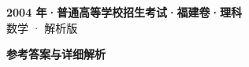 \documentclass[zihao=-4, a4paper]{ctexart}
\begin{document}
\begin{center}
  {\Large\bfseries 2004 年·普通高等学校招生考试·福建卷·理科}\\[4pt]
  {\large 数学 · 解析版}
\end{center}
\medskip
{}

\clearpage
{}
\begin{center}{\Large\bfseries 参考答案与详细解析}\end{center}
\medskip

\end{document}

